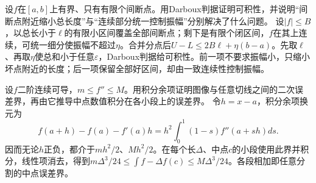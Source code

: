 设\(f\)在\([a,b]\)上有界、只有有限个间断点。用Darboux判据证明可积性，并说明“间断点附近缩小总长度”与“连续部分统一控制振幅”分别解决了什么问题。
\solutionanswer
设\(|f|\le B\)，以总长小于\(\ell\)的有限小区间覆盖全部间断点；剩下是有限个闭区间，\(f\)在其上连续，可统一细分使振幅不超过\(\eta\)。合并分点后\(U-L\le2B\ell+\eta(b-a)\)。先取\(\ell\)、再取\(\eta\)使总和小于任意\(\varepsilon\)，Darboux判据给可积性。前一项不要求振幅小，只缩小坏点附近的长度；后一项保留全部好区间，却由一致连续性控制振幅。


设\(f\)二阶连续可导，\(m\le f''\le M\)。用积分余项证明图像与任意切线之间的二次误差界，再由它推导中点数值积分在各小段上的误差界。
\solutionanswer
令\(h=x-a\)，积分余项换元为
\[
 f(a+h)-f(a)-f'(a)h=h^2\int_0^1(1-s)f''(a+sh)ds.
\]
因而无论\(h\)正负，都介于\(mh^2/2\)、\(Mh^2/2\)。在每个长\(\Delta\)、中点\(c\)的小段使用此界并积分，线性项消去，得到\(m\Delta^3/24\le\int f-\Delta f(c)\le M\Delta^3/24\)。各段相加即任意分割的中点误差界。
\par
